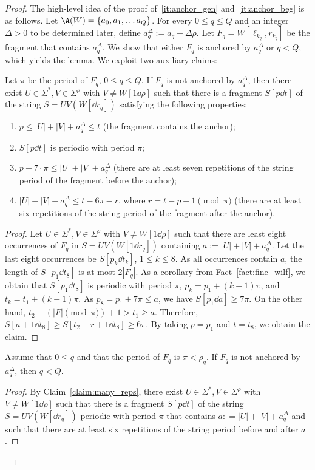 \begin{proof}
The high-level idea of the proof of~\ref{it:anchor_gen} and~\ref{it:anchor_beg} is as follows. Let $\A(W)= \{a_0,a_1, \ldots a_Q \}$. For every $0 \le q \le Q$ and an integer $\Delta > 0$ to be determined later, define $a_q^\Delta := a_q +\Delta \rho$. Let $F_q=W[\ell_{k_q},r_{k_q}]$ be the fragment that contains $a_q^{\Delta}$. We show that either $F_q$ is anchored by $a_q^{\Delta}$ or $q < Q$, which yields the lemma. We exploit two auxiliary claims:

\begin{claim}\label{claim:many_reps}
Let $\pi$ be the period of $F_q$, $0 \le q \le Q$. If $F_q$ is not anchored by $a_q^\Delta$, then there exist $U \in \Sigma^\ast, V \in \Sigma^\rho$ with $V \neq W[1 \dd \rho]$ such that there is a fragment $S[p \dd t]$ of the string $S = UV(W[\dd r_q])$ satisfying the following properties:
\begin{enumerate}
\item $p \le |U|+|V|+a_q^\Delta \le t$ (the fragment contains the anchor);
\item $S[p \dd t]$ is periodic with period $\pi$;
\item $p+7\cdot \pi \le |U|+|V|+a_q^\Delta$ (there are at least seven repetitions of the string period of the fragment before the anchor);
\item $|U|+|V|+a_q^\Delta \le t-6\pi-r$, where $r = t-p+1 \pmod \pi$ (there are at least six repetitions of the string period of the fragment after the anchor). 
\end{enumerate}
\end{claim}
\begin{proof}
Let $U \in \Sigma^\ast, V \in \Sigma^\rho$ with $V \neq W[1 \dd \rho]$ such that there are least eight occurrences of $F_q$ in $S = UV(W[1 \dd r_q])$ containing $a := |U|+|V|+a_q^\Delta$. Let the last eight occurrences be $S[p_k \dd t_k]$, $1 \le k \le 8$. As all occurrences contain $a$, the length of $S[p_1 \dd t_8]$ is at most $2|F_q|$. As a corollary from Fact~\ref{fact:fine_wilf}, we obtain that $S[p_1 \dd t_8]$ is periodic with period $\pi$, $p_k = p_1 + (k-1) \pi$, and $t_k = t_1 + (k-1) \pi$. As $p_8 = p_1+7\pi \le a$,  we have $S[p_1 \dd a] \ge 7 \pi$. On the other hand, $t_2-(|F|\pmod \pi)+1 > t_1 \ge a$. Therefore, $S[a+1 \dd t_8] \ge S[t_2-r+1 \dd t_8] \ge 6\pi$. By taking $p = p_1$ and $t = t_8$, we obtain the claim. 
\end{proof}

\begin{claim}\label{claim:next_level}
Assume that $0 \le q$ and that the period of $F_q$ is $\pi < \rho_q$. If $F_q$ is not anchored by $a_q^\Delta$, then $q < Q$. 
\end{claim}
\begin{proof}
By Claim~\ref{claim:many_reps}, there exist $U \in \Sigma^\ast, V \in \Sigma^\rho$ with $V \neq W[1 \dd \rho]$ such that there is a fragment $S[p \dd t]$ of the string $S = UV(W[\dd r_q])$ periodic with period $\pi$ that contains $a: = |U|+|V|+a_q^\Delta$ and such that there are at least six repetitions of the string period before and after $a$.


\end{proof}
\end{proof}
